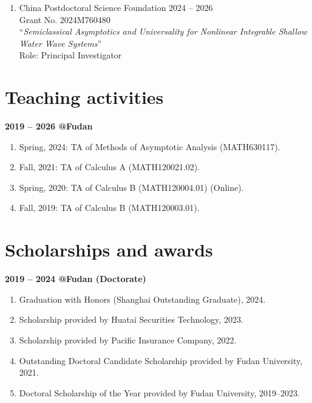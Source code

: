 \documentclass[margin]{res}
\begin{document}
\begin{resume}
\begin{enumerate}[--]
\item China Postdoctoral Science Foundation  \hfill 2024 -- 2026\\
Grant No. 2024M760480\\
``{\sl Semiclassical Asymptotics and Universality for Nonlinear Integrable Shallow Water Wave Systems}'' \\
Role: Principal Investigator
\end{enumerate}



\section{Teaching activities}
\textbf{2019 -- 2026 @Fudan}
\begin{enumerate}[--]
\item Spring, 2024: TA of Methods of Asymptotic Analysis (MATH630117).
\item Fall, 2021: TA of Calculus A (MATH120021.02).
\item Spring, 2020: TA of Calculus B (MATH120004.01) (Online).
\item Fall, 2019: TA of Calculus B (MATH120003.01).
\end{enumerate}


\section{Scholarships and awards}
\textbf{2019 -- 2024 @Fudan (Doctorate)}
\begin{enumerate}[--]
    \item Graduation with Honors (Shanghai Outstanding Graduate), 2024.
    \item Scholarship provided by Huatai Securities Technology, 2023.
    \item Scholarship provided by Pacific Insurance Company, 2022. 
    \item Outstanding Doctoral Candidate Scholarship provided by Fudan University, 2021. 
    \item Doctoral Scholarship of the Year provided by Fudan University, 2019--2023. 
\end{enumerate}


\end{resume}
\end{document}
